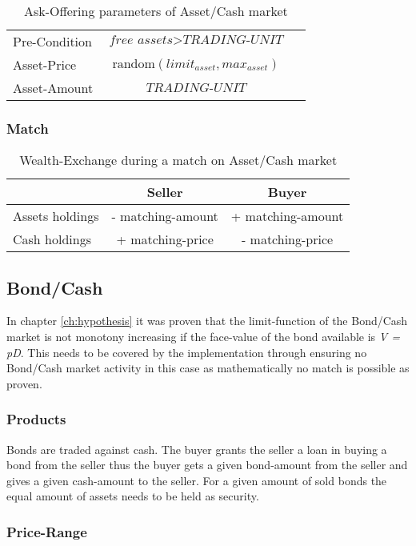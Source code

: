 \documentclass[Bachelorarbeit.tex]{subfiles}
\begin{document}
\begin{table}[H]
	\centering
	\caption{Ask-Offering parameters of Asset/Cash market}
	\begin{tabular} { l c r }
		\hline
		Pre-Condition & $\textit{free assets} > \textit{TRADING-UNIT}$  \\
		Asset-Price & $\mathrm{random}(limit_{asset}, max_{asset})$ \\
		Asset-Amount & $\textit{TRADING-UNIT}$ \\
		\hline
	\end{tabular}
\end{table}

\subsubsection{Match}

\begin{table}[H]
	\centering
	\caption{Wealth-Exchange during a match on Asset/Cash market}
	\begin{tabular} { l c c }
		& Seller & Buyer \\
		\hline
		Assets holdings & - matching-amount & + matching-amount \\
		Cash holdings  & + matching-price & - matching-price \\
		\hline
	\end{tabular}
\end{table}

\subsection{Bond/Cash}
In chapter \ref{ch:hypothesis} it was proven that the limit-function of the Bond/Cash market is not monotony increasing if the face-value of the bond available is \textit{V = pD}. This needs to be covered by the implementation through ensuring no Bond/Cash market activity in this case as mathematically no match is possible as proven.

\subsubsection{Products}
Bonds are traded against cash. The buyer grants the seller a loan in buying a bond from the seller thus the buyer gets a given bond-amount from the seller and gives a given cash-amount to the seller. For a given amount of sold bonds the equal amount of assets needs to be held as security.

\subsubsection{Price-Range}
\end{document}

